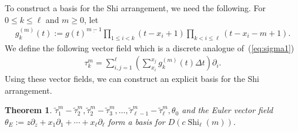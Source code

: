 \documentclass[10pt,a4paper]{amsart}
\numberwithin{equation}{section}
\newtheorem{Theorem}{Theorem}[section]
\newcommand{\Shi}{\operatorname{Shi}}
\newcommand{\sint}{\sum\nolimits}
\begin{document}
To construct a basis for the Shi arrangement, we need the following.
For $0\leq k\leq\ell$ and $m\geq 0$, let
\begin{gather*}
g_k^{(m)}(t):=
g(t)^{\underline{m-1}}
\prod_{1\leq i<k}(t-x_i+1)
\prod_{k<i\leq\ell}(t-x_i-m+1).
\end{gather*}
We define the following vector field which is a discrete analogue of~(\ref{eq:sigma1})
\begin{gather*}
\tau_k^m=
\sum_{i, j=1}^\ell
\left(
\sint_{x_i}^{x_j}g_k^{(m)}(t) \Delta t
\right)
\partial_i.
\end{gather*}
Using these vector fields, we can construct an explicit basis for the Shi arrangement.

\begin{Theorem}
$\widetilde{\tau}_1^m-\widetilde{\tau}_2^m, \widetilde{\tau}_2^m-\widetilde{\tau}_3^m, \dots,
\widetilde{\tau}_{\ell-1}^m-\widetilde{\tau}_\ell^m, \theta_0$ and
the Euler vector field
$\theta_E:=z\partial_z+x_1\partial_1+\cdots+x_\ell\partial_\ell$
form a basis for $D(c\Shi_\ell(m))$.
\end{Theorem}
\end{document}
